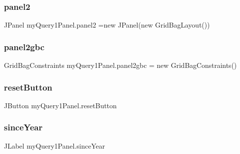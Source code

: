 \hypertarget{classmy_query1_panel_aba2fe28e793bc84fe789e98c7b89e065}{}\label{classmy_query1_panel_aba2fe28e793bc84fe789e98c7b89e065} 
\subsubsection{\texorpdfstring{panel2}{panel2}}
{\footnotesize\ttfamily J\+Panel my\+Query1\+Panel.\+panel2 =new J\+Panel(new Grid\+Bag\+Layout())\hspace{0.3cm}{\ttfamily [protected]}}

\hypertarget{classmy_query1_panel_a950bb4c948bbc32c52dcd51b9c37a8fd}{}\label{classmy_query1_panel_a950bb4c948bbc32c52dcd51b9c37a8fd} 
\subsubsection{\texorpdfstring{panel2gbc}{panel2gbc}}
{\footnotesize\ttfamily Grid\+Bag\+Constraints my\+Query1\+Panel.\+panel2gbc = new Grid\+Bag\+Constraints()\hspace{0.3cm}{\ttfamily [private]}}

\hypertarget{classmy_query1_panel_a0e0a620150837e7d0caa3386fdd1879b}{}\label{classmy_query1_panel_a0e0a620150837e7d0caa3386fdd1879b} 
\subsubsection{\texorpdfstring{reset\+Button}{resetButton}}
{\footnotesize\ttfamily J\+Button my\+Query1\+Panel.\+reset\+Button\hspace{0.3cm}{\ttfamily [protected]}}

\hypertarget{classmy_query1_panel_a4a96735d4624a707ca5c9f774a95f054}{}\label{classmy_query1_panel_a4a96735d4624a707ca5c9f774a95f054} 
\subsubsection{\texorpdfstring{since\+Year}{sinceYear}}
{\footnotesize\ttfamily J\+Label my\+Query1\+Panel.\+since\+Year\hspace{0.3cm}{\ttfamily [private]}}

